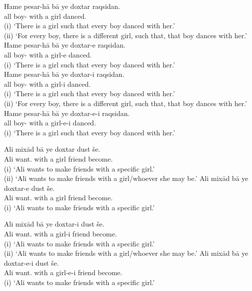 \documentclass[output=paper]{langsci/langscibook}
\begin{document}
\begin{exe}
\ex\label{4ex:25}
	\begin{xlista}
	\ex\label{4ex:25a}
	\gll	Hame	pesar-hā	bā 	ye doxtar	raqsidan. \\
		all	boy-{}		with	a   girl		danced.{} \\
	\glt	(i) `There is a girl such that every boy danced with her.' \\
		(ii) `For every boy, there is a different girl, such that, that boy dances with her.'
	\ex\label{4ex:25b}
	\gll	Hame	pesar-hā	bā 	ye doxtar-e	raqsidan. \\
		all	boy-{}	with	a   	girl-e		danced.{} \\
	\glt	(i) `There is a girl such that every boy danced with her.' \\
	\ex\label{4ex:25c}
	\gll	Hame	pesar-hā	bā 	ye doxtar-i		raqsidan. \\
		all	boy-{}	with		a  girl-i		danced.{} \\
	\glt	(i) `There is a girl such that every boy danced with her.' \\
		(ii) `For every boy, there is a different girl, such that, that boy dances with her.' 
	\ex\label{4ex:25d}
	\gll	Hame	pesar-hā	bā 	ye doxtar-e-i	 raqsidan. \\
		all	boy-{}	with		a  girl-e-i	 danced.{} \\
	\glt	(i) `There is a girl such that every boy danced with her.'
	\end{xlista}
\ex\label{4ex:26}
	\begin{xlista}
	\ex\label{4ex:26a}
	\gll	Ali	mixād		bā 	ye doxtar	dust 	še. \\
		Ali	want.{}	with 	a   girl		friend	become.{\sc{3sg}} \\
	\glt	(i) `Ali wants to make friends with a specific girl.' \\
		(ii) `Ali wants to make friends with a girl/whoever she may be.'
	\ex\label{4ex:26b}
	\gll	Ali	mixād		bā 	ye doxtar-e	dust 	še. \\
		Ali	want.{}	with 	a   girl		friend	become.{\sc{3sg}} \\
	\glt	(i) `Ali wants to make friends with a specific girl.'

	\ex\label{4ex:26c}
	\gll	Ali	mixād		bā 	ye doxtar-i	 dust 	še. \\
		Ali	want.{}	with 	a   girl-i	friend	become.{\sc{3sg}} \\
	\glt	(i) `Ali wants to make friends with a specific girl.' \\
		(ii) `Ali wants to make friends with a girl/whoever she may be.'
	\ex\label{4ex:26d}
	\gll	Ali	mixād		bā 	ye doxtar-e-i	dust 	še. \\
		Ali	want.{}	with 	a   girl-e-i	friend	become.{\sc{3sg}} \\
	\glt	(i) `Ali wants to make friends with a specific girl.'
	\end{xlista}
\end{exe}
\end{document}
